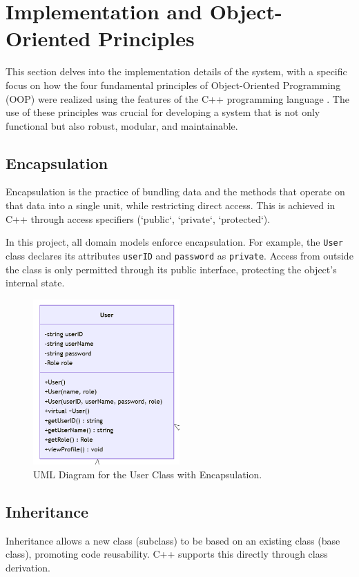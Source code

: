 \section{Implementation and Object-Oriented Principles}
\label{sec:implementation_oop}

This section delves into the implementation details of the system, with a specific focus on how the four fundamental principles of Object-Oriented Programming (OOP) \cite{Booch2007} were realized using the features of the C++ programming language \cite{Stroustrup2013}. The use of these principles was crucial for developing a system that is not only functional but also robust, modular, and maintainable.

\subsection{Encapsulation}
Encapsulation is the practice of bundling data and the methods that operate on that data into a single unit, while restricting direct access. This is achieved in C++ through access specifiers (`public`, `private`, `protected`).

In this project, all domain models enforce encapsulation. For example, the \texttt{User} class declares its attributes \texttt{userID} and \texttt{password} as \texttt{private}. Access from outside the class is only permitted through its public interface, protecting the object's internal state.

\begin{figure}[H]
	\centering
	\includegraphics[width=0.5\textwidth]{figures/user_class_encap.png}
	\caption{UML Diagram for the User Class with Encapsulation.}
	\label{fig:user_class_encap}
\end{figure}

\subsection{Inheritance}
Inheritance allows a new class (subclass) to be based on an existing class (base class), promoting code reusability. C++ supports this directly through class derivation.

